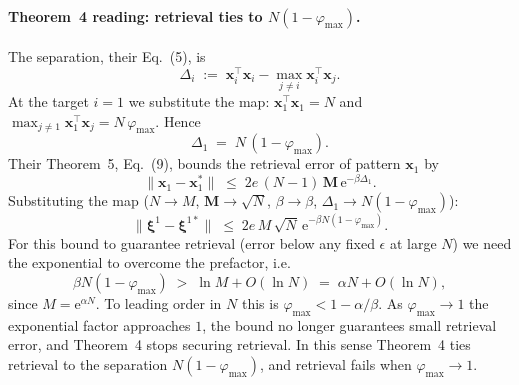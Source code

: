 \documentclass[letterpaper]{article} %
\newcommand{\bxi}{\boldsymbol{\xi}}
\newcommand{\e}{{\mathrm{e}}}
\newcommand{\Bnet}{\beta}
\begin{document}
\paragraph{Theorem~4 reading: retrieval ties to $N(1-\varphi_{\max})$.}
The separation, their Eq.~(5), is
\begin{equation*}
\Delta_i \;:=\; \bm x_i^\top \bm x_i - \max_{j \neq i}\bm x_i^\top \bm x_j.
\end{equation*}
At the target $i = 1$ we substitute the map: $\bm x_1^\top \bm x_1 = N$
and $\max_{j \neq 1}\bm x_1^\top \bm x_j = N\,\varphi_{\max}$.  Hence
\begin{equation*}
\Delta_1 \;=\; N\,(1 - \varphi_{\max}).
\end{equation*}
Their Theorem~5, Eq.~(9), bounds the retrieval error of pattern
$\bm x_1$ by
\begin{equation*}
\|\bm x_1 - \bm x_1^*\| \;\leq\; 2 e\,(N-1)\,\mathbf M\,\e^{-\beta \Delta_1}.
\end{equation*}
Substituting the map ($N \to M$, $\mathbf M \to \sqrt N$,
$\beta \to \Bnet$, $\Delta_1 \to N(1-\varphi_{\max})$):
\begin{equation*}
\|\bxi^1 - \bxi^{1*}\| \;\leq\; 2 e\,M\,\sqrt N\,\e^{-\Bnet N(1-\varphi_{\max})}.
\end{equation*}
For this bound to guarantee retrieval (error below any fixed
$\epsilon$ at large $N$) we need the exponential to overcome the
prefactor, i.e.
\begin{equation*}
\Bnet N (1-\varphi_{\max}) \;>\; \ln M + O(\ln N) \;=\; \alpha N + O(\ln N),
\end{equation*}
since $M = \e^{\alpha N}$.  To leading order in $N$ this is
$\varphi_{\max} < 1 - \alpha/\Bnet$.  As $\varphi_{\max} \to 1$ the
exponential factor approaches $1$, the bound no longer guarantees
small retrieval error, and Theorem~4 stops securing retrieval.  In
this sense Theorem~4 ties retrieval to the separation
$N(1-\varphi_{\max})$, and retrieval fails when
$\varphi_{\max} \to 1$.
\end{document}

